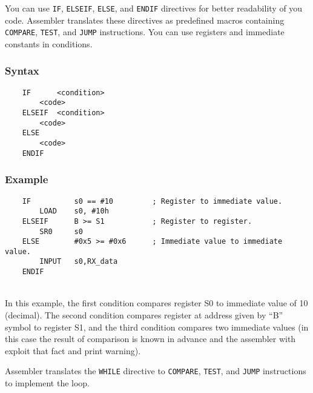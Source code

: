     \clearpage
        You can use \texttt{IF}, \texttt{ELSEIF}, \texttt{ELSE}, and \texttt{ENDIF} directives for better readability of you code. Assembler translates these directives as predefined macros containing \texttt{COMPARE}, \texttt{TEST}, and \texttt{JUMP} instructions. You can use registers and immediate constants in conditions.

        \subsubsection{Syntax}
            \verb'    IF      <condition>'\\
            \verb'        <code>'\\
            \verb'    ELSEIF  <condition>'\\
            \verb'        <code>'\\
            \verb'    ELSE'\\
            \verb'        <code>'\\
            \verb'    ENDIF'

        \subsubsection{Example}
            \verb'    IF          s0 == #10         ; Register to immediate value.'\\
            \verb'        LOAD    s0, #10h'\\
            \verb'    ELSEIF      B >= S1           ; Register to register.'\\
            \verb'        SR0     s0'\\
            \verb'    ELSE        #0x5 >= #0x6      ; Immediate value to immediate value.'\\
            \verb'        INPUT   s0,RX_data'\\
            \verb'    ENDIF'

            ~\\In this example, the first condition compares register S0 to immediate value of 10 (decimal). The second condition compares register at address given by ``B'' symbol to register S1, and the third condition compares two immediate values (in this case the result of comparison is known in advance and the assembler with exploit that fact and print warning).

    \clearpage
        Assembler translates the \texttt{WHILE} directive to \texttt{COMPARE}, \texttt{TEST}, and \texttt{JUMP} instructions to implement the loop.

